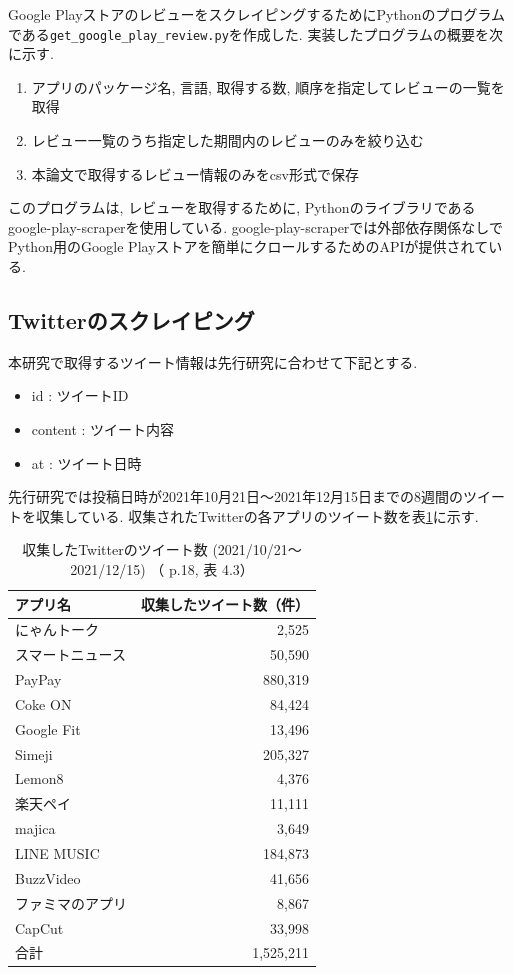 Google PlayストアのレビューをスクレイピングするためにPythonのプログラムである\verb|get_google_play_review.py|を作成した. 
実装したプログラムの概要を次に示す. 

\begin{enumerate}
  \item アプリのパッケージ名, 言語, 取得する数, 順序を指定してレビューの一覧を取得
  \item レビュー一覧のうち指定した期間内のレビューのみを絞り込む
  \item 本論文で取得するレビュー情報のみをcsv形式で保存
\end{enumerate}
このプログラムは, レビューを取得するために, Pythonのライブラリであるgoogle-play-scraperを使用している. 
google-play-scraperでは外部依存関係なしでPython用のGoogle Playストアを簡単にクロールするためのAPIが提供されている\cite{google-play-scraper}. 


\subsection{Twitterのスクレイピング}
\label{sec:x}
本研究で取得するツイート情報は先行研究\cite{kawatsura}に合わせて下記とする. 
\begin{itemize}
 \item id : ツイートID
 \item content : ツイート内容
 \item at : ツイート日時
\end{itemize}

先行研究では投稿日時が2021年10月21日〜2021年12月15日までの8週間のツイートを収集している. 収集されたTwitterの各アプリのツイート数を表\ref{tb:rawtweetnum}に示す. 

\begin{table}[H]
  \caption{収集したTwitterのツイート数 (2021/10/21〜2021/12/15) （ \cite{kawatsura} p.18, 表 4.3）}
  \label{tb:rawtweetnum}
  \begin{center}
  \begin{tabular}{l|r}
    \hline
    アプリ名&収集したツイート数（件）\\\hline\hline
    にゃんトーク&2,525\\\hline
    スマートニュース&50,590\\\hline
    PayPay&880,319\\\hline
    Coke ON&84,424\\\hline
    Google Fit&13,496\\\hline
    Simeji&205,327\\\hline
    Lemon8&4,376\\\hline
    楽天ペイ&11,111\\\hline
    majica&3,649\\\hline
    LINE MUSIC&184,873\\\hline
    BuzzVideo&41,656\\\hline
    ファミマのアプリ&8,867\\\hline
    CapCut&33,998\\\hline\hline
    合計&1,525,211
  \end{tabular}\end{center}
\end{table}

